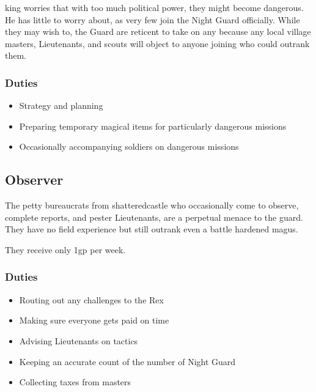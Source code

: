 \begin{multicols}{2}
\Gls{king} worries that with too much political power, they might become dangerous.
He has little to worry about, as very few join the Night Guard officially.
While they may wish to, the Guard are reticent to take on any because any local village masters, Lieutenants, and scouts will object to anyone joining who could outrank them.

\subsubsection{Duties}

\begin{itemize}

  \item{Strategy and planning}
  \item{Preparing temporary magical items for particularly dangerous missions}
  \item{Occasionally accompanying soldiers on dangerous missions}

\end{itemize}

\subsection{Observer}

The petty bureaucrats from \gls{shatteredcastle} who occasionally come to observe, complete reports, and pester Lieutenants, are a perpetual menace to the \gls{guard}.
They have no field experience but still outrank even a battle hardened magus.

They receive only 1gp per week.

\subsubsection{Duties}

\begin{itemize}

  \item{Routing out any challenges to the Rex}
  \item{Making sure everyone gets paid on time}
  \item{Advising Lieutenants on tactics}
  \item{Keeping an accurate count of the number of Night Guard}
  \item{Collecting taxes from masters}

\end{itemize}


\end{multicols}

